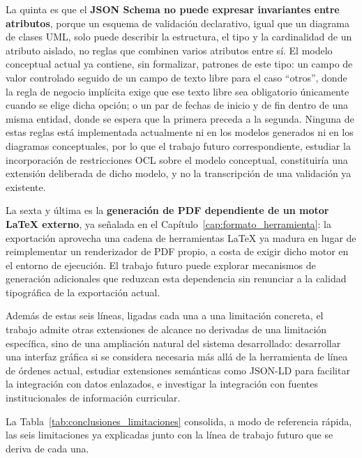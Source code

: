 La quinta es que el \textbf{JSON Schema no puede expresar invariantes entre
atributos}, porque un esquema de validación declarativo, igual que un
diagrama de clases UML, solo puede describir la estructura, el tipo y la
cardinalidad de un atributo aislado, no reglas que combinen varios atributos
entre sí. El modelo conceptual actual ya contiene, sin formalizar, patrones
de este tipo: un campo de valor controlado seguido de un campo de texto
libre para el caso ``otros'', donde la regla de negocio implícita exige que
ese texto libre sea obligatorio únicamente cuando se elige dicha opción; o
un par de fechas de inicio y de fin dentro de una misma entidad, donde se
espera que la primera preceda a la segunda. Ninguna de estas reglas está
implementada actualmente ni en los modelos generados ni en los diagramas
conceptuales, por lo que el trabajo futuro correspondiente, estudiar la
incorporación de restricciones OCL sobre el modelo conceptual, constituiría
una extensión deliberada de dicho modelo, y no la transcripción de una
validación ya existente.

La sexta y última es la \textbf{generación de PDF dependiente de un motor
LaTeX externo}, ya señalada en el Capítulo~\ref{cap:formato_herramienta}:
la exportación aprovecha una cadena de herramientas LaTeX ya madura en
lugar de reimplementar un renderizador de PDF propio, a costa de exigir
dicho motor en el entorno de ejecución. El trabajo futuro puede explorar
mecanismos de generación adicionales que reduzcan esta dependencia sin
renunciar a la calidad tipográfica de la exportación actual.

Además de estas seis líneas, ligadas cada una a una limitación concreta, el
trabajo admite otras extensiones de alcance no derivadas de una limitación
específica, sino de una ampliación natural del sistema desarrollado:
desarrollar una interfaz gráfica si se considera necesaria más allá de la
herramienta de línea de órdenes actual, estudiar extensiones semánticas
como JSON-LD para facilitar la integración con datos enlazados, e
investigar la integración con fuentes institucionales de información
curricular.

La Tabla~\ref{tab:conclusiones_limitaciones} consolida, a modo de
referencia rápida, las seis limitaciones ya explicadas junto con la línea
de trabajo futuro que se deriva de cada una.

